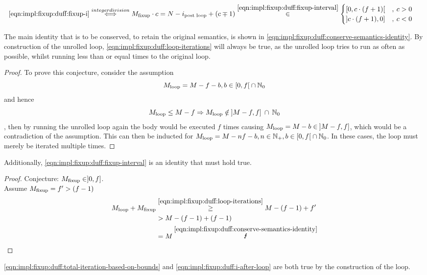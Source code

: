 \begin{equation}\label{eqn:impl:fixup:duff:fixup-i-mult}
\begin{aligned}
    \ref{eqn:impl:fixup:duff:fixup-i} &\overset{integer division}{\Longleftrightarrow} M_{\text{fixup}} \cdot c = N - i_\text{post loop} + (c \mp 1) \overset{\ref{eqn:impl:fixup:duff:fixup-interval}}{\in}  \begin{cases} \lbrack 0, c \cdot (f + 1) \lbrack &, \medspace c > 0\\ \rbrack c \cdot (f + 1), 0 \rbrack &, \medspace c < 0 \end{cases} 
\end{aligned}
\end{equation}

The main identity that is to be conserved, to retain the original semantics, is shown in \cref{eqn:impl:fixup:duff:conserve-semantics-identity}.
By construction of the unrolled loop, \cref{eqn:impl:fixup:duff:loop-iterations} will always be true, as the unrolled loop tries to run as often as possible, whilst running less than or equal times to the original loop.

\begin{proof}\label{proof:impl:fixup:duff:loop-iterations}
To prove this conjecture, consider the assumption
\[M_{\text{loop}} = M - f - b,  b \in \lbrack 0, f \lbrack \medspace \cap \medspace \mathbb{N}_0\]
and hence
\[M_{\text{loop}} \leq M - f \Rightarrow M_{\text{loop}} \notin \medspace \rbrack M-f,f \rbrack \medspace \cap \medspace \mathbb{N}_0 \]
, then by running the unrolled loop again the body would be executed $f$ times causing $M_{\text{loop}} = M - b \in \medspace \rbrack M-f,f \rbrack$, which would be a contradiction of the assumption.
This can then be inducted for $M_{\text{loop}} = M - nf - b, n \in \mathbb{N}_{+}, b \in \lbrack 0, f \lbrack \medspace \cap \medspace \mathbb{N}_0$.
In these cases, the loop must merely be iterated multiple times.
\end{proof}

Additionally, \cref{eqn:impl:fixup:duff:fixup-interval} is an identity that must hold true.
\begin{proof}\label{proof:impl:fixup:duff:fixup-interval}
Conjecture: $M_{\text{fixup}} \in \rbrack 0,  f \rbrack$.\\

Assume $M_{\text{fixup}} = f' > (f - 1)$
\begin{align*}
    \Mloop + \Mfixup &\overset{\ref{eqn:impl:fixup:duff:loop-iterations}}{\geq} M - (f - 1) + f' \\
    &> M - (f - 1) + (f - 1) \\
    &= M \medspace \overset{\ref{eqn:impl:fixup:duff:conserve-semantics-identity}}{\mLightning}
\end{align*}
\end{proof}

\cref{eqn:impl:fixup:duff:total-iteration-based-on-bounds} and \cref{eqn:impl:fixup:duff:i-after-loop} are both true by the construction of the loop.

